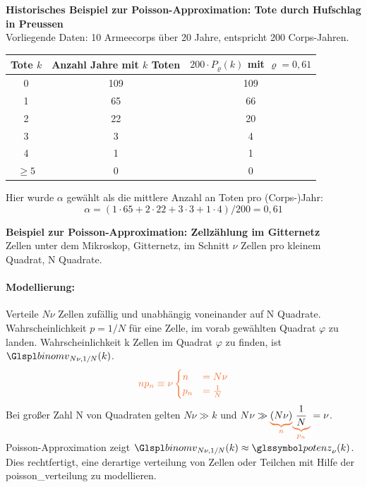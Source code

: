 \begin{bsp}
    \textbf{Historisches Beispiel zur Poisson-Approximation: Tote durch Hufschlag in Preussen}  \\
    Vorliegende Daten: 10 Armeecorps über 20 Jahre,
    entspricht 200 Corps-Jahren.
    \begin{mytable}
        \begin{tabular}{|c|c|c|}
            \hline
            Tote $k$ & Anzahl Jahre mit $k$ Toten & $200 \cdot P_\varrho(k)$ mit $\varrho = 0{,}61$ \\
            \hline
            0 & 109 & 109 \\
            1 & 65  & 66  \\
            2 & 22  & 20  \\
            3 & 3   & 4   \\
            4 & 1   & 1   \\
            $\geq 5$ & 0 & 0 \\
            \hline
        \end{tabular}
        \caption{Die durch Schlag eines Pferdes im preussischen Heere Getöteten (Ladislaus von Bortkiewicz, Das Gesetz der kleinen Zahlen, Teubner (1898))}
    \end{mytable}
    Hier wurde $\alpha$ gewählt als die mittlere Anzahl an Toten pro (Corps-)Jahr:
    \[
        \alpha = (1 \cdot 65 + 2 \cdot 22 + 3 \cdot 3 + 1 \cdot 4)/200 = 0, 61
    \]
\end{bsp}

\begin{bsp}
    \textbf{Beispiel zur Poisson-Approximation: Zellzählung im Gitternetz}  \\
    Zellen unter dem Mikroskop, Gitternetz, im Schnitt $\nu$ Zellen pro kleinem Quadrat, N Quadrate.
    \paragraph{Modellierung:} Verteile $N \nu$ Zellen zufällig und unabhängig voneinander auf N Quadrate.
    Wahrscheinlichkeit $p = 1/N$ für eine Zelle, im vorab gewählten Quadrat $\varphi$ zu landen.
    Wahrscheinlichkeit k Zellen im Quadrat $\varphi$ zu finden, ist $\Bnmv_{N\nu , 1/N}(k)$. \\
    \[
        \txo{ np_n \equiv \nu
        \begin{cases}
            n  & = N \nu \\
            p_n & = \frac{1}{N}
        \end{cases}
        }
    \]
    Bei großer Zahl N von Quadraten gelten $N \nu \gg k$ und $N \nu \gg \oub{(N\nu)}{n}  \oub{\frac{1}{N}}{p_n} = \nu$. \\
    Poisson-Approximation zeigt $\Bnmv_{N\nu , 1/N}(k) \approx \potm_{\nu}(k)$. \\
    Dies rechtfertigt, eine derartige \gls{verteilung} von Zellen oder Teilchen mit Hilfe der
    \gls{poisson_verteilung} zu modellieren.
\end{bsp}

